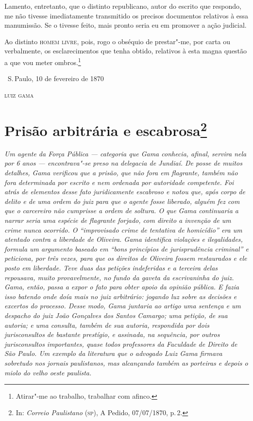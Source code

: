 Lamento, entretanto, que o distinto republicano, autor do escrito que
respondo, me não tivesse imediatamente transmitido os precisos
documentos relativos à essa manumissão. Se o tivesse feito, mais pronto
seria eu em promover a ação judicial.

Ao distinto \textsc{homem livre}, pois, rogo o obséquio de prestar"-me, por carta
ou verbalmente, os esclarecimentos que tenha obtido, relativos à esta
magna questão a que vou meter ombros.\footnote{Atirar"-me ao trabalho,
  trabalhar com afinco.}

\bigskip

\hfill\ S.\,Paulo, 10 de fevereiro de 1870\smallskip

\hfill\textsc{luiz gama}


\chapter{Prisão arbitrária e escabrosa\footnote[*]{In: \emph{Correio Paulistano} (\textsc{sp}), A Pedido,
  07/07/1870, p.\,2.}} %

\begin{flushleft}
{\footnotesize\itshape
Um agente da Força Pública --- categoria que Gama conhecia,
afinal, servira nela por 6 anos --- encontrava"-se preso
na delegacia de Jundiaí. De posse de muitos detalhes,
Gama verificou que a prisão, que não fora em flagrante, também não fora
determinada por escrito e nem ordenada por autoridade competente.
Foi atrás de elementos desse fato juridicamente escabroso e notou que, após corpo de
delito e de uma ordem do juiz para que o agente fosse liberado,
alguém fez com que o
carcereiro não cumprisse a ordem de soltura.
O que Gama continuaria a narrar seria uma espécie de flagrante forjado, com direito a invenção
de um crime nunca ocorrido. O ``improvisado crime de
tentativa de homicídio'' era um atentado contra a liberdade de
Oliveira. Gama identifica violações e ilegalidades,
formula um argumento baseado em ``bons princípios de jurisprudência
criminal'' e peticiona, por três vezes, para que os direitos
de Oliveira fossem restaurados e ele posto em liberdade. Teve duas das
petições indeferidas e a terceira delas repousava, muito provavelmente,
no fundo da gaveta da escrivaninha do juiz. Gama, então, passa a expor
o fato para obter apoio da opinião pública.
E fazia isso batendo onde doía mais no
juiz arbitrário: jogando luz sobre as decisões e excertos do processo.
Desse modo, Gama juntaria ao artigo uma sentença e um despacho do
juiz João Gonçalves dos Santos Camargo; uma petição, de sua autoria; e
uma consulta, também de sua autoria, respondida por dois jurisconsultos
de bastante prestígio, e assinada, na
sequência, por outros jurisconsultos importantes, quase todos
professores da Faculdade de Direito de São Paulo.
Um exemplo da literatura
que o advogado Luiz Gama firmava sobretudo nos
jornais paulistanos, mas alcançando
também as porteiras e depois o miolo do velho oeste paulista. }
\end{flushleft}

